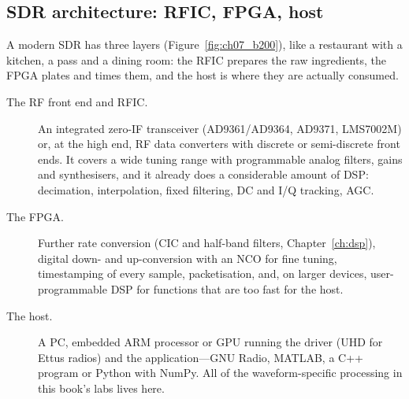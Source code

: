 
\subsection{SDR architecture: RFIC, FPGA, host}

A modern SDR has three layers (Figure~\ref{fig:ch07_b200}), like a restaurant with a kitchen, a pass
and a dining room: the RFIC prepares the raw ingredients, the FPGA plates and times them, and the host
is where they are actually consumed.
\begin{description}
\item[The RF front end and RFIC.] An integrated zero-IF transceiver (AD9361/AD9364, AD9371, LMS7002M)
or, at the high end, RF data converters with discrete or semi-discrete front ends. It covers a wide
tuning range with programmable analog filters, gains and synthesisers, and it already does a
considerable amount of DSP: decimation, interpolation, fixed filtering, DC and I/Q tracking, AGC.
\item[The FPGA.] Further rate conversion (CIC and half-band filters, Chapter~\ref{ch:dsp}), digital
down- and up-conversion with an NCO for fine tuning, timestamping of every sample, packetisation, and,
on larger devices, user-programmable DSP for functions that are too fast for the host.
\item[The host.] A PC, embedded ARM processor or GPU running the driver (UHD for Ettus radios) and the
application---GNU Radio, MATLAB, a C++ program or Python with NumPy. All of the waveform-specific
processing in this book's labs lives here.
\end{description}

